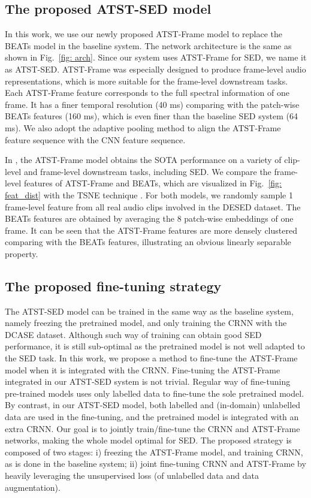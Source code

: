 \documentclass{article}
\begin{document}
\subsection{The proposed ATST-SED model}
In this work, we use our newly proposed ATST-Frame  model \cite{li2023self} to replace the BEATs model in the baseline system. The network architecture is the same as shown in Fig.~\ref{fig: arch}. Since our system uses ATST-Frame for SED, we name it as ATST-SED. 
ATST-Frame was especially designed to produce frame-level audio representations, which is more suitable for the frame-level downstream tasks. Each ATST-Frame feature corresponds to the full spectral information of one frame. It has a finer temporal resolution (40 ms) comparing with the patch-wise BEATs features (160 ms), which is even finer than the baseline SED system (64 ms). We also adopt the adaptive pooling method to align the ATST-Frame feature sequence with the CNN feature sequence. 


In \cite{li2023self}, the ATST-Frame model obtains the SOTA performance on a variety of clip-level and frame-level downstream tasks, including SED. We compare the frame-level features of ATST-Frame and BEATs, which are visualized in Fig.~\ref{fig: feat_dist} with the TSNE technique \cite{Hinton2008tsne}. For both models, we randomly sample 1 frame-level feature from all real audio clips involved in the DESED dataset. The BEATs features are obtained by averaging the 8 patch-wise embeddings of one frame. It can be seen that the ATST-Frame features are more densely clustered comparing with the BEATs features, illustrating an obvious linearly separable property.




\subsection{The proposed fine-tuning strategy}
The ATST-SED model can be trained in the same way as the baseline system, namely freezing the pretrained model, and only training the CRNN with the DCASE dataset. Although such way of training can obtain good SED performance, it is still sub-optimal as the pretrained model is not well adapted to the SED task. 
In this work, we propose a method to fine-tune the ATST-Frame model when it is integrated with the CRNN. 
Fine-tuning the ATST-Frame integrated in our ATST-SED system is not trivial. Regular way of fine-tuning pre-trained models uses only labelled data to fine-tune the sole pretrained model. By contrast, in our ATST-SED model, both labelled and (in-domain) unlabelled data are used in the fine-tuning, and the pretrained model is integrated with an extra CRNN. 
Our goal is to jointly train/fine-tune the CRNN and ATST-Frame networks, making the whole model optimal for SED. The proposed strategy is composed of two stages: i) freezing the ATST-Frame model, and training CRNN, as is done in the baseline system; ii) joint fine-tuning CRNN and ATST-Frame by heavily leveraging the unsupervised loss (of unlabelled data and data augmentation).  
\end{document}
